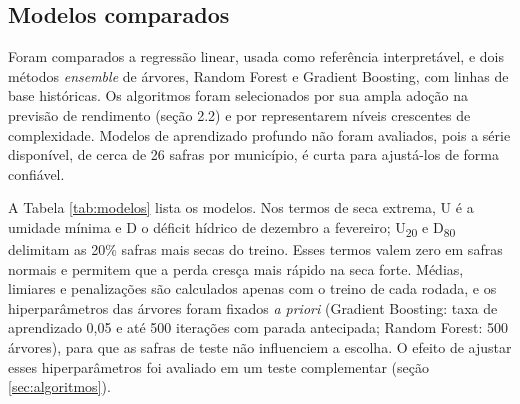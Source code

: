 \documentclass[
	article,			%
	11pt,				%
	oneside,			%
	a4paper,			%
	english,			%
	brazil,				%
	sumario=tradicional
	]{abntex2}
\begin{document}
\subsection{Modelos comparados}

Foram comparados a regressão linear, usada como referência interpretável, e dois métodos \emph{ensemble} de árvores, Random Forest e Gradient Boosting, com linhas de base históricas. Os algoritmos foram selecionados por sua ampla adoção na previsão de rendimento (seção 2.2) e por representarem níveis crescentes de complexidade. Modelos de aprendizado profundo não foram avaliados, pois a série disponível, de cerca de 26 safras por município, é curta para ajustá-los de forma confiável.

A Tabela \ref{tab:modelos} lista os modelos. Nos termos de seca extrema, U é a umidade mínima e D o déficit hídrico de dezembro a fevereiro; U\textsubscript{20} e D\textsubscript{80} delimitam as 20\% safras mais secas do treino. Esses termos valem zero em safras normais e permitem que a perda cresça mais rápido na seca forte. Médias, limiares e penalizações são calculados apenas com o treino de cada rodada, e os hiperparâmetros das árvores foram fixados \emph{a priori} (Gradient Boosting: taxa de aprendizado 0,05 e até 500 iterações com parada antecipada; Random Forest: 500 árvores), para que as safras de teste não influenciem a escolha. O efeito de ajustar esses hiperparâmetros foi avaliado em um teste complementar (seção \ref{sec:algoritmos}).
\end{document}
